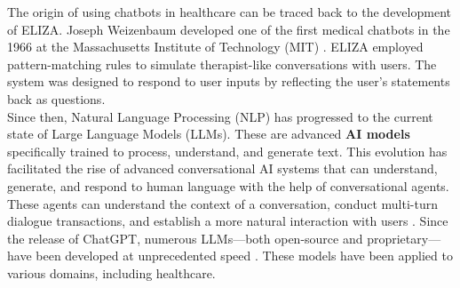 \noindent The origin of using chatbots in healthcare can be traced back to the development of ELIZA. Joseph Weizenbaum developed one of the first medical chatbots in the 1966 at the Massachusetts Institute of Technology (MIT) \cite{haug2023artificial, weizenbaum1966eliza}. ELIZA employed pattern-matching rules to simulate therapist-like conversations with users. The system was designed to respond to user inputs by reflecting the user's statements back as questions. \\[\baselineskip]

\noindent Since then, Natural Language Processing (NLP) has progressed to the current state of Large Language Models (LLMs). These are advanced \textcolor{TUMRed}{\textbf{AI models}} specifically trained to process, understand, and generate text. This evolution has facilitated the rise of advanced conversational AI systems that can understand, generate, and respond to human language with the help of conversational agents. These agents can understand the context of a conversation, conduct multi-turn dialogue transactions, and establish a more natural interaction with users \cite{clark2019makes}. Since the release of ChatGPT, numerous LLMs---both open-source and proprietary---have been developed at unprecedented speed \cite{clusmann2023future}. These models have been applied to various domains, including healthcare.

